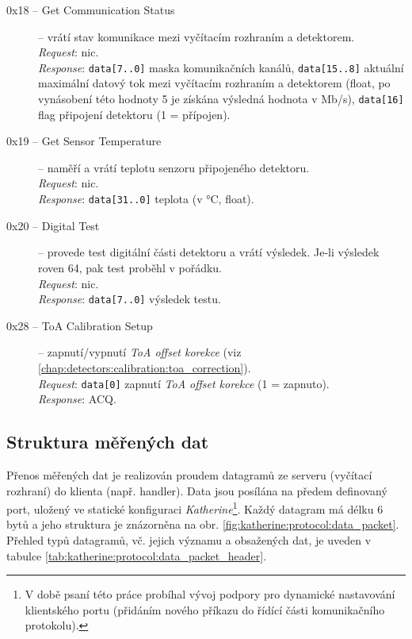 \begin{description}
    \item[0x18 -- Get Communication Status] -- vrátí stav komunikace mezi vyčítacím rozhraním a detektorem.
    \\\textit{Request}: nic.
    \\\textit{Response}: \texttt{data[7..0]} maska komunikačních kanálů, \texttt{data[15..8]} aktuální maximální datový tok mezi vyčítacím rozhraním a detektorem (float, po vynásobení této hodnoty 5 je získána výsledná hodnota v Mb/s), \texttt{data[16]} flag připojení detektoru (1 = přípojen).

    \item[0x19 -- Get Sensor Temperature] -- naměří a vrátí teplotu senzoru připojeného detektoru.
    \\\textit{Request}: nic.
    \\\textit{Response}: \texttt{data[31..0]} teplota (v °C, float).

    \item[0x20 -- Digital Test] -- provede test digitální části detektoru a vrátí výsledek. Je-li výsledek roven 64, pak test proběhl v pořádku.
    \\\textit{Request}: nic.
    \\\textit{Response}: \texttt{data[7..0]} výsledek testu.

    \item[0x28 -- ToA Calibration Setup] -- zapnutí/vypnutí \textit{ToA offset korekce} (viz \ref{chap:detectors:calibration:toa_correction}).
    \\\textit{Request}: \texttt{data[0]} zapnutí \textit{ToA offset korekce} (1 = zapnuto).
    \\\textit{Response}: ACQ.

\end{description}

\subsection{Struktura měřených dat}\label{chap:katherine:protocol:measure_data_structure}
Přenos měřených dat je realizován proudem datagramů ze serveru (vyčítací rozhraní) do klienta (např. handler). Data jsou posílána na předem definovaný port, uložený ve statické konfiguraci \textit{Katherine}\footnote{V době psaní této práce probíhal vývoj podpory pro dynamické nastavování klientského portu (přidáním nového příkazu do řídící části komunikačního protokolu).}. Každý datagram má délku 6 bytů a jeho struktura je znázorněna na obr. \ref{fig:katherine:protocol:data_packet}. Přehled typů datagramů, vč. jejich významu a obsažených dat, je uveden v tabulce \ref{tab:katherine:protocol:data_packet_header}.

